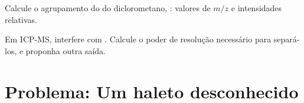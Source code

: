 \begin{exercise}[$\star\star\star$]\label{exo:b2:mass-spec-atomic:11}
Calcule o agrupamento do  do diclorometano, : valores de $m/z$ e intensidades
relativas.
\end{exercise}

\begin{exercise}[$\star\star\star$]\label{exo:b2:mass-spec-atomic:12}
Em ICP-MS,  interfere com . Calcule o poder de resolução necessário
para separá-los, e proponha outra saída.
\end{exercise}

\section{Problema: Um haleto desconhecido}

